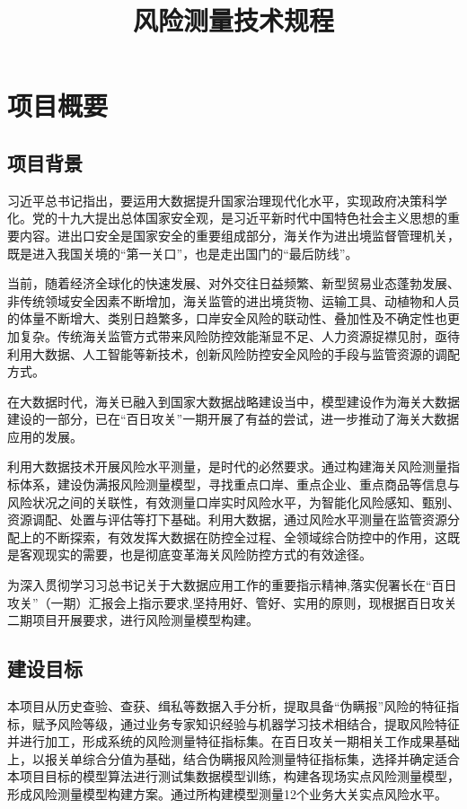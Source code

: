 \documentclass[a4paper]{tufte-book}%
\title{风险测量技术规程}
\theoremstyle{definition}
\theoremstyle{definition}
\begin{document}
\maketitle

\tableofcontents


\chapter{项目概要}
\section{项目背景}
习近平总书记指出，要运用大数据提升国家治理现代化水平，实现政府决策科学化。党的十九大提出总体国家安全观，是习近平新时代中国特色社会主义思想的重要内容。进出口安全是国家安全的重要组成部分，海关作为进出境监督管理机关，既是进入我国关境的“第一关口”，也是走出国门的“最后防线”。

当前，随着经济全球化的快速发展、对外交往日益频繁、新型贸易业态蓬勃发展、非传统领域安全因素不断增加，海关监管的进出境货物、运输工具、动植物和人员的体量不断增大、类别日趋繁多，口岸安全风险的联动性、叠加性及不确定性也更加复杂。传统海关监管方式带来风险防控效能渐显不足、人力资源捉襟见肘，亟待利用大数据、人工智能等新技术，创新风险防控安全风险的手段与监管资源的调配方式。

在大数据时代，海关已融入到国家大数据战略建设当中，模型建设作为海关大数据建设的一部分，已在“百日攻关”一期开展了有益的尝试，进一步推动了海关大数据应用的发展。

利用大数据技术开展风险水平测量，是时代的必然要求。通过构建海关风险测量指标体系，建设伪满报风险测量模型，寻找重点口岸、重点企业、重点商品等信息与风险状况之间的关联性，有效测量口岸实时风险水平，为智能化风险感知、甄别、资源调配、处置与评估等打下基础。利用大数据，通过风险水平测量在监管资源分配上的不断探索，有效发挥大数据在防控全过程、全领域综合防控中的作用，这既是客观现实的需要，也是彻底变革海关风险防控方式的有效途径。

为深入贯彻学习习总书记关于大数据应用工作的重要指示精神,落实倪署长在“百日攻关”（一期）汇报会上指示要求,坚持用好、管好、实用的原则，现根据百日攻关二期项目开展要求，进行风险测量模型构建。

\section{建设目标}
本项目从历史查验、查获、缉私等数据入手分析，提取具备“伪瞒报”风险的特征指标，赋予风险等级，通过业务专家知识经验与机器学习技术相结合，提取风险特征并进行加工，形成系统的风险测量特征指标集。在百日攻关一期相关工作成果基础上，以报关单综合分值为基础，结合伪瞒报风险测量特征指标集，选择并确定适合本项目目标的模型算法进行测试集数据模型训练，构建各现场实点风险测量模型，形成风险测量模型构建方案。通过所构建模型测量12个业务大关实点风险水平。
\end{document}
